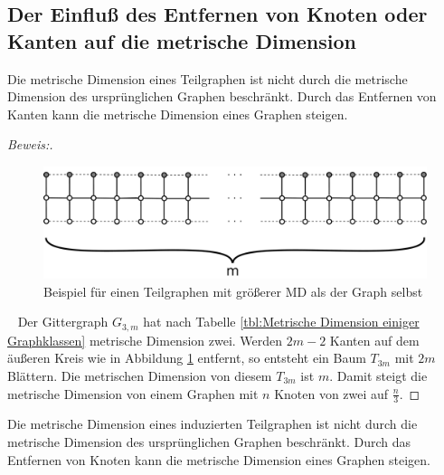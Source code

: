 \subsection{Der Einfluß des Entfernen von Knoten oder Kanten auf die metrische Dimension}
\begin{lem}
Die metrische Dimension eines Teilgraphen ist nicht durch die metrische Dimension des ursprünglichen Graphen beschränkt. Durch das Entfernen von Kanten kann die metrische Dimension eines Graphen steigen.
\end{lem}
\begin{proof}[Beweis:]$\;$
\begin{figure}[h!]
		\centering 		 
\includegraphics[width=420pt]{bilder/gitterzubaum.pdf}
   \caption{Beispiel für einen Teilgraphen mit größerer MD als der Graph selbst}
   \label{bild:Gitterbaum1}
\end{figure}
~ \linebreak
Der Gittergraph $G_{3,m}$ hat nach Tabelle \ref{tbl:Metrische Dimension einiger Graphklassen} metrische Dimension zwei. Werden $2m-2$ Kanten auf dem äußeren Kreis wie in Abbildung \ref{bild:Gitterbaum1} entfernt, so entsteht ein Baum $T_{3m}$ mit $2m$ Blättern. Die metrischen Dimension von diesem $T_{3m}$ ist $m$. Damit steigt die metrische Dimension von einem Graphen mit $n$ Knoten von zwei auf $\frac{n}{3}$.
\end{proof}
\begin{lem}
Die metrische Dimension eines induzierten Teilgraphen ist nicht durch die metrische Dimension des ursprünglichen Graphen beschränkt. Durch das Entfernen von Knoten kann die metrische Dimension eines Graphen steigen.
\end{lem}
